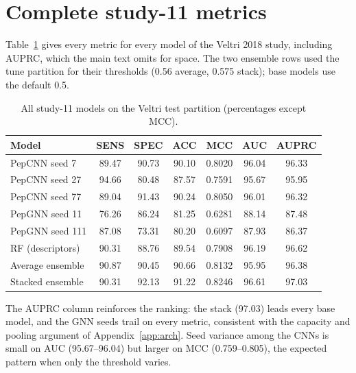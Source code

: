 
\section{Complete study-11 metrics}\label{app:basefull}
Table~\ref{tab:basefull} gives every metric for every model of the Veltri
2018 study, including AUPRC, which the main text omits for space. The two
ensemble rows used the tune partition for their thresholds (0.56 average,
0.575 stack); base models use the default 0.5.

\begin{table}[h]\centering\small
\caption{All study-11 models on the Veltri test partition (percentages
except MCC).}
\label{tab:basefull}
\begin{tabular}{lcccccc}
\hline
Model & SENS & SPEC & ACC & MCC & AUC & AUPRC \\
\hline
PepCNN seed 7 & 89.47 & 90.73 & 90.10 & 0.8020 & 96.04 & 96.33 \\
PepCNN seed 27 & 94.66 & 80.48 & 87.57 & 0.7591 & 95.67 & 95.95 \\
PepCNN seed 77 & 89.04 & 91.43 & 90.24 & 0.8050 & 96.01 & 96.32 \\
PepGNN seed 11 & 76.26 & 86.24 & 81.25 & 0.6281 & 88.14 & 87.48 \\
PepGNN seed 111 & 87.08 & 73.31 & 80.20 & 0.6097 & 87.93 & 86.37 \\
RF (descriptors) & 90.31 & 88.76 & 89.54 & 0.7908 & 96.19 & 96.62 \\
Average ensemble & 90.87 & 90.45 & 90.66 & 0.8132 & 95.95 & 96.38 \\
Stacked ensemble & 90.31 & 92.13 & 91.22 & 0.8246 & 96.61 & 97.03 \\
\hline
\end{tabular}
\end{table}

The AUPRC column reinforces the ranking: the stack (97.03) leads every
base model, and the GNN seeds trail on every metric, consistent with the
capacity and pooling argument of Appendix~\ref{app:arch}. Seed variance
among the CNNs is small on AUC (95.67--96.04) but larger on MCC
(0.759--0.805), the expected pattern when only the threshold varies.
